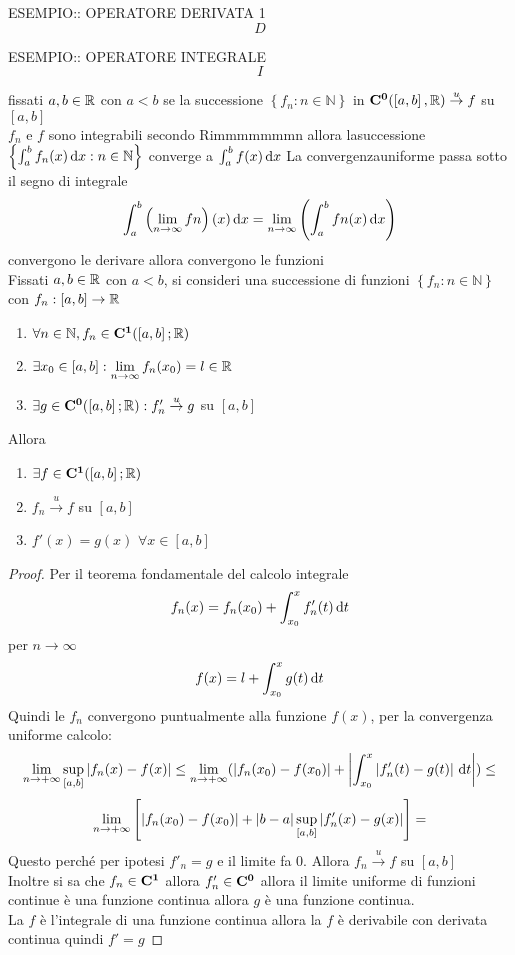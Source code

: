 ESEMPIO:: OPERATORE DERIVATA 1\\
$$D$$

ESEMPIO:: OPERATORE INTEGRALE\\
$$I$$

\proposition
fissati $a,b\in \mathbb{R}$ con $a<b$ se la successione $\left\{f_n:n\in\mathbb{N}\right\}$ in $\mathbf{C^{0}}(\left[a,b\right], \mathbb{R})\overset{u}{\to}f$ su $\left[a,b\right]$\\
$f_n$ e $f$ sono integrabili secondo Rimmmmmmmn allora lasuccessione $\left\{\int_a^bf_n(x)\,\mathrm{d}{x}:n\in\mathbb{N}\right\}$ converge a $\int_a^bf(x)\,\mathrm{d}{x}$
\observation
La convergenzauniforme passa sotto il segno di integrale 
$$\int_a^b\left(\lim\limits_{n\to\infty}fn\right)(x)\,\mathrm{d}{x}=\lim\limits_{n\to\infty}\left(\int_a^bfn(x)\,\mathrm{d}{x}\right)$$
\proposition convergono le derivare allora convergono le funzioni\\
Fissati $a,b\in \mathbb{R}$ con $a<b$, si consideri una successione di funzioni $\left\{f_n:n\in\mathbb{N}\right\}$ con $f_n:\left[a,b\right]\to \mathbb{R}$
\begin{enumerate}
	\item $\forall n\in\mathbb{N}, f_n\in \mathbf{C^{1}}(\left[a,b\right]; \mathbb{R})$
	\item $\exists x_0\in\left[a,b\right]: \lim\limits_{n\to\infty}f_n(x_0)=l\in \mathbb{R}$
	\item $\exists g \in \mathbf{C^{0}}(\left[a,b\right]; \mathbb{R}):f'_n\overset{u}{\to}g$ su $\left[a,b\right]$
\end{enumerate}
Allora
\begin{enumerate}
	\item $\exists f\in \mathbf{C^{1}}(\left[a,b\right]; \mathbb{R})$
	\item $f_n\overset{u}{\to}f$ su $\left[a,b\right]$
	\item $f'(x)=g(x)$ $\forall x\in\left[a,b\right]$
\end{enumerate}
\begin{proof}
	Per il teorema fondamentale del calcolo integrale
	$$f_n(x)=f_n(x_0)+\int_{x_0}^{x}f_n'(t)\,\mathrm{d}{t}$$
	per $n\to\infty$
	$$f(x)=l+\int_{x_0}^{x}g(t)\,\mathrm{d}{t}$$
	Quindi le $f_n$ convergono puntualmente alla funzione $f(x)$, per la convergenza uniforme calcolo:
	$$ \lim\limits_{n\to+\infty}\sup\limits_{\left[a,b\right]}\left|f_n(x)-f(x)\right|\le\lim\limits_{n\to+\infty}(\left|f_n(x_0)-f(x_0)\right|+\left|\int_{x_0}^x \left|f_n'(t)-g(t)\right|\,\mathrm{d}{t}\right|)\le$$
	$$\lim\limits_{n\to+\infty}\left[ \left|f_n(x_0)-f(x_0)\right|+\left|b-a\right|\sup\limits_{\left[a,b\right]}\left|f_n'(x)-g(x)\right| \right] = $$
	Questo perché per ipotesi $f'_n=g$ e il limite fa $0$.
	Allora $f_n\overset{u}{\to}f$ su $\left[a,b\right]$\\
	Inoltre si sa che $f_n\in \mathbf{C^{1}}$ allora $f_n'\in \mathbf{C^{0}}$ allora il limite uniforme di funzioni continue è una funzione continua allora $g$ è una funzione continua.\\
	La $f$ è l'integrale di una funzione continua allora la $f$ è derivabile con derivata continua quindi $f'=g$
\end{proof}
